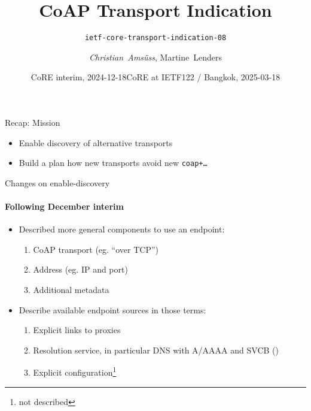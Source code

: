 

\title{CoAP Transport Indication}
\subtitle{\texttt{ietf-core-transport-indication-08}}
\author{\textit{Christian~Amsüss}, Martine~Lenders}
\date{CoRE interim, 2024-12-18}
\date{CoRE at IETF122 / Bangkok, 2025-03-18}



\frame{\titlepage}

\begin{frame}{Recap: Mission}\Large
    \begin{itemize}
        \item Enable discovery of alternative transports

        \item Build a plan how new transports avoid new \texttt{coap+…}
    \end{itemize}
\end{frame}

\begin{frame}{Changes on enable-discovery}\framesubtitle{Following December interim}\Large
    \begin{itemize}
        \item Described more general components to use an endpoint:
            \begin{enumerate}\Large
                \item CoAP transport (eg. ``over TCP'')
                \item Address (eg. IP and port)
                \item Additional metadata
            \end{enumerate}
            \bigskip
        \item Describe available endpoint sources in those terms:
            \begin{enumerate}\Large
                \item Explicit links to proxies
                \item Resolution service, in particular DNS with A/AAAA and SVCB ()
                \item \color{gray}Explicit configuration\footnote{not described}
            \end{enumerate}
    \end{itemize}
\end{frame}

